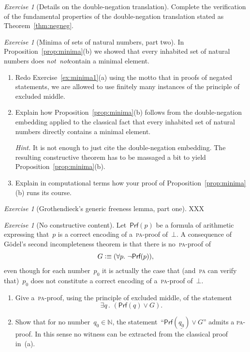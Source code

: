 \documentclass[10pt,reqno,a4paper,openany]{amsbook}
\theoremstyle{definition}
\theoremstyle{plain}
\theoremstyle{remark}
\newcommand{\NN}{\mathbb{N}}
\newcommand{\?}{\,{:}\,}
\renewcommand{\_}{\mathpunct{.}\,}
\newcommand{\defequiv}{\vcentcolon\equiv}
\newtheorem{exercise}[defn]{Exercise}
\newcommand{\notnot}{\emph{not~not}}
\begin{document}
\begin{exercise}[Details on the double-negation translation]
Complete the verification of the fundamental properties of the double-negation
translation stated as Theorem~\ref{thm:negneg}.
\end{exercise}

\begin{exercise}[Minima of sets of natural numbers, part two]
In Proposition~\ref{prop:minima}(b) we showed that every inhabited set of natural
numbers does \notnot contain a minimal element.
\begin{enumerate}
\item Redo Exercise~\ref{ex:minima1}(a) using the motto that in proofs of
negated statements, we are allowed to use finitely many instances of the
principle of excluded middle.
\item Explain how Proposition~\ref{prop:minima}(b) follows
from the double-negation embedding applied to the classical fact that every
inhabited set of natural numbers directly contains a minimal element.

{\noindent\scriptsize\emph{Hint.} It is not enough to just cite the
double-negation embedding. The resulting constructive theorem has to be
massaged a bit to yield Proposition~\ref{prop:minima}(b).\par}
\item Explain in computational terms how your proof of
Proposition~\ref{prop:minima}(b) runs its course.
\end{enumerate}
\end{exercise}

\begin{exercise}[Grothendieck's generic freeness lemma, part one]
XXX
\end{exercise}

\begin{exercise}[No constructive content]\label{ex:no-constructive-content}
Let~$\textsf{Prf}(p)$ be a formula of arithmetic expressing that~$p$ is a
correct encoding of a~\textsc{pa}-proof of~$\bot$. A consequence of Gödel's
second incompleteness theorem is that there is no~\textsc{pa}-proof of
\[ G \defequiv (\forall p\_ \neg\textsf{Prf}(p)), \]
even though for each number~$p_0$ it is actually the case that (and~\textsc{pa}
can verify that)~$p_0$ does not constitute a correct encoding of
a~\textsc{pa}-proof of~$\bot$.
\begin{enumerate}
\item Give a~\textsc{pa}-proof, using the principle of excluded middle, of the
statement
\[ \exists q\_ (\textsf{Prf}(q) \vee G). \]
\item Show that for no number~$q_0 \in \NN$, the
statement~``$\textsf{Prf}(\underline{q_0})
\vee G$'' admits a \textsc{pa}-proof. In this sense no witness can be
extracted from the classical proof in~(a).
\end{enumerate}
\end{exercise}
\end{document}
